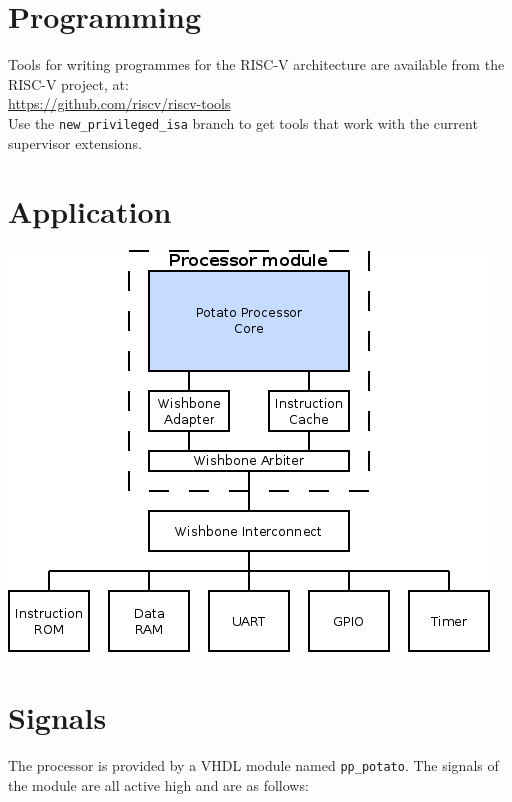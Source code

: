 \documentclass[10pt,a4paper]{article}
\begin{document}
\begin{minipage}[t]{0.48\textwidth}
\section{Programming}

Tools for writing programmes for the RISC-V architecture are available from the
RISC-V project, at:\\[1em]
\url{https://github.com/riscv/riscv-tools}\\

Use the \texttt{new\_privileged\_isa} branch to get tools that work with the
current supervisor extensions.

\end{minipage}\hfill
\begin{minipage}[t]{0.48\textwidth}

\section{Application}
\includegraphics[width=\textwidth]{example.png}

\section{Signals}

The processor is provided by a VHDL module named \texttt{pp\_potato}. The signals of
the module are all active high and are as follows:\\


\end{minipage}
\end{document}
